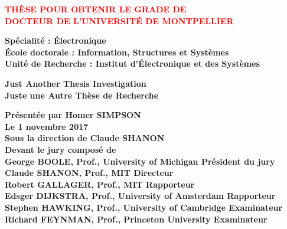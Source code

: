 \vspace{1.75cm}

\begin{center}
	{
	\large	
	\textbf{\textcolor{red}{THÈSE POUR OBTENIR LE GRADE DE\\ DOCTEUR DE L'UNIVERSITÉ DE MONTPELLIER}}
	}
	\vspace{1cm}

	\textbf{Spécialité : Électronique}\\
	\vspace{0.5cm}
	\textbf{École doctorale : Information, Structures et Systèmes}\\
	\vspace{0.5cm}
	\textbf{Unité de Recherche : Institut d'Électronique et des Systèmes}

	\vspace{1.25cm}

	{
	\Large
	\textbf{Just Another Thesis Investigation\\}
	\vspace{0.75cm}
	\textbf{Juste une Autre Thèse de Recherche\\}
	}

	\vspace{1.5cm}
	
	{
		\bfseries
		{
			\large
			Présentée par Homer SIMPSON\\
			Le 1 novembre 2017\\
		}
		\vspace{0.5cm}
		Sous la direction de Claude SHANON\\
		\vspace{0.5cm}
		{
		\small
		Devant le jury composé de\\
		\vspace{0.5cm}	
		George BOOLE, Prof., University of Michigan \hfill Président du jury \\
		Claude SHANON, Prof., MIT \hfill Directeur \\
		Robert GALLAGER, Prof., MIT \hfill Rapporteur \\
		Edsger DIJKSTRA, Prof., University of Amsterdam \hfill Rapporteur \\
		Stephen HAWKING, Prof., University of Cambridge \hfill Examinateur\\
		Richard FEYNMAN, Prof., Princeton University \hfill Examinateur\\
		}
	}

\end{center}

\AddToShipoutPicture*{\BackgroundPic}